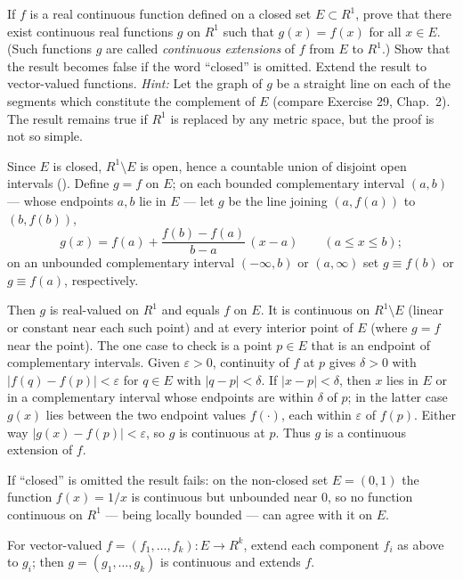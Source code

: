 \documentclass[main.tex]{subfiles}
\begin{document}
If $f$ is a real continuous function defined on a closed set $E \subset R^{1}$, prove that there exist continuous real functions $g$ on $R^{1}$ such that $g(x) = f(x)$ for all $x \in E$. (Such functions $g$ are called \textit{continuous extensions} of $f$ from $E$ to $R^{1}$.) Show that the result becomes false if the word ``closed'' is omitted. Extend the result to vector-valued functions. \textit{Hint:} Let the graph of $g$ be a straight line on each of the segments which constitute the complement of $E$ (compare Exercise 29, Chap.\ 2). The result remains true if $R^{1}$ is replaced by any metric space, but the proof is not so simple.
\begin{SolutionBlue}
Since $E$ is closed, $R^{1} \setminus E$ is open, hence a countable union of disjoint open intervals (). Define $g = f$ on $E$; on each bounded complementary interval $(a, b)$ --- whose endpoints $a, b$ lie in $E$ --- let $g$ be the line joining $(a, f(a))$ to $(b, f(b))$,
\[
g(x) = f(a) + \frac{f(b) - f(a)}{b - a}\,(x - a) \qquad (a \le x \le b);
\]
on an unbounded complementary interval $(-\infty, b)$ or $(a, \infty)$ set $g \equiv f(b)$ or $g \equiv f(a)$, respectively.

Then $g$ is real-valued on $R^{1}$ and equals $f$ on $E$. It is continuous on $R^{1} \setminus E$ (linear or constant near each such point) and at every interior point of $E$ (where $g = f$ near the point). The one case to check is a point $p \in E$ that is an endpoint of complementary intervals. Given $\varepsilon > 0$, continuity of $f$ at $p$ gives $\delta > 0$ with $|f(q) - f(p)| < \varepsilon$ for $q \in E$ with $|q - p| < \delta$. If $|x - p| < \delta$, then $x$ lies in $E$ or in a complementary interval whose endpoints are within $\delta$ of $p$; in the latter case $g(x)$ lies between the two endpoint values $f(\cdot)$, each within $\varepsilon$ of $f(p)$. Either way $|g(x) - f(p)| < \varepsilon$, so $g$ is continuous at $p$. Thus $g$ is a continuous extension of $f$.

If ``closed'' is omitted the result fails: on the non-closed set $E = (0, 1)$ the function $f(x) = 1/x$ is continuous but unbounded near $0$, so no function continuous on $R^{1}$ --- being locally bounded --- can agree with it on $E$.

For vector-valued $f = (f_{1}, \dots, f_{k}) : E \to R^{k}$, extend each component $f_{i}$ as above to $g_{i}$; then $g = (g_{1}, \dots, g_{k})$ is continuous and extends $f$.
\end{SolutionBlue}
\end{document}
